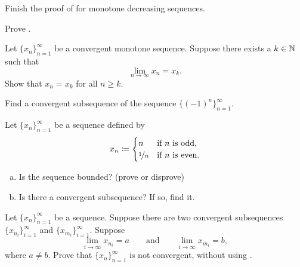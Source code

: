 \begin{exercise}
Finish the proof of  for monotone decreasing
sequences.
\end{exercise}

\begin{exercise}
Prove .
\end{exercise}

\begin{exercise}
Let $\{ x_n \}_{n=1}^\infty$ be a convergent monotone sequence.  Suppose 
there exists a $k \in {\mathbb{N}}$ such that
\begin{equation*}
\lim_{n\to \infty} x_n = x_k .
\end{equation*}
Show that $x_n = x_k$ for all $n \geq k$.
\end{exercise}

\begin{exercise}
\pagebreak[2]
Find a convergent subsequence of the sequence
$\bigl\{ {(-1)}^n \bigr\}_{n=1}^\infty$.
\end{exercise}

\begin{exercise}
Let $\{x_n\}_{n=1}^\infty$ be a sequence defined by
\begin{equation*}
x_n \coloneqq 
\begin{cases}
n               & \text{if } n \text{ is odd} , \\
\nicefrac{1}{n} & \text{if } n \text{ is even} .
\end{cases}
\avoidbreak
\end{equation*}
\begin{enumerate}[a)]
\item Is the sequence bounded? (prove or disprove)
\item Is there a convergent subsequence?  If so, find it.
\end{enumerate}
\end{exercise}

\begin{exercise}
\pagebreak[2]
Let $\{ x_n \}_{n=1}^\infty$ be a sequence.
Suppose there are two convergent subsequences $\{ x_{n_i} \}_{i=1}^\infty$ and
$\{ x_{m_i} \}_{i=1}^\infty$.  Suppose 
\begin{equation*}
\lim_{i\to\infty} x_{n_i} = a
\qquad \text{and} \qquad
\lim_{i\to\infty} x_{m_i} = b,
\end{equation*}
where $a \not= b$.  Prove that $\{ x_n \}_{n=1}^\infty$ is not convergent, without
using .
\end{exercise}

